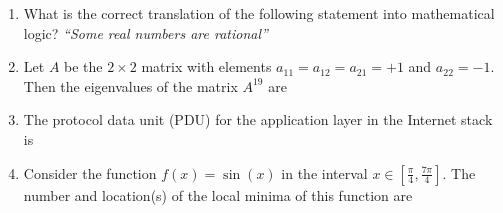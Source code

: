 \documentclass[journal]{IEEEtran}
\numberwithin{equation}{enumi}
\numberwithin{figure}{enumi}
\begin{document}
\begin{enumerate}
\item What is the correct translation of the following statement into mathematical logic?  
\textit{``Some real numbers are rational''}
\begin{enumerate}
\end{enumerate}

\item Let $A$ be the $2 \times 2$ matrix with elements  
$a_{11} = a_{12} = a_{21} = +1$ and $a_{22} = -1$.  
Then the eigenvalues of the matrix $A^{19}$ are
\begin{enumerate}
\end{enumerate}

\item The protocol data unit (PDU) for the application layer in the Internet stack is
\begin{enumerate}
\end{enumerate}

\item Consider the function $f(x) = \sin(x)$ in the interval $x \in \left[\tfrac{\pi}{4}, \tfrac{7\pi}{4}\right]$. 
  The number and location(s) of the local minima of this function are  
\begin{enumerate}
\end{enumerate}
  

\end{enumerate}
\end{document}
